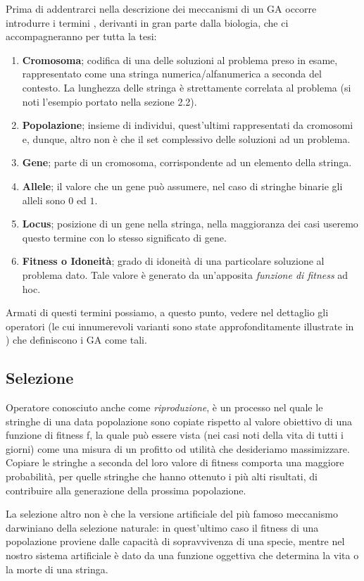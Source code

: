 Prima di addentrarci nella descrizione dei meccanismi di un GA occorre introdurre i termini \cite{goldberg1}, derivanti in gran parte dalla biologia, che ci accompagneranno per tutta la tesi:
\begin{enumerate}
    \item \textbf{Cromosoma}; codifica di una delle soluzioni al problema preso in esame, rappresentato come una stringa numerica/alfanumerica a seconda del contesto. La lunghezza delle stringa \`e strettamente correlata al problema (si noti l'esempio portato nella sezione 2.2).
    \item \textbf{Popolazione}; insieme di individui, quest'ultimi rappresentati da cromosomi e, dunque, altro non \`e che il set complessivo delle soluzioni ad un problema.
    \item \textbf{Gene}; parte di un cromosoma, corrispondente ad un elemento della stringa.
    \item \textbf{Allele}; il valore che un gene pu\`o assumere, nel caso di stringhe binarie gli alleli sono $0$ ed $1$.
    \item \textbf{Locus}; posizione di un gene nella stringa, nella maggioranza dei casi useremo questo termine con lo stesso significato di gene.
    \item \textbf{Fitness o Idoneit\`a}; grado di idoneit\`a di una particolare soluzione al problema dato. Tale valore \`e generato da un'apposita \textit{funzione di fitness} ad hoc.
\end{enumerate}
Armati di questi termini possiamo, a questo punto, vedere nel dettaglio gli operatori (le cui innumerevoli varianti sono state approfonditamente illustrate in \cite{glossary}) che definiscono i GA come tali.
\subsection{Selezione}
Operatore conosciuto anche come \textit{riproduzione}, \`e un processo nel quale le stringhe di una data popolazione sono copiate rispetto al valore obiettivo di una funzione di fitness f, la quale pu\`o essere vista (nei casi noti della vita di tutti i giorni) come una misura di un profitto od utilit\`a che desideriamo massimizzare.
Copiare le stringhe a seconda del loro valore di fitness comporta una maggiore probabilit\`a, per quelle stringhe che hanno ottenuto i pi\`u alti risultati, di contribuire alla generazione della prossima popolazione.

La selezione altro non \`e che la versione artificiale del pi\`u famoso meccanismo darwiniano della selezione naturale: in quest'ultimo caso il fitness di una popolazione proviene dalle capacit\`a di sopravvivenza di una specie, mentre nel nostro sistema artificiale \`e dato da una funzione oggettiva che determina la vita o la morte di una stringa.
\vspace{3mm}

